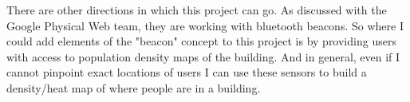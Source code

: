 \documentclass[11pt]{article}
\begin{document}
\quad There are other directions in which this project can go. As discussed with the Google Physical Web team, they are working with bluetooth beacons. So where I could add elements of the "beacon" concept to this project is by providing users with access to population density maps of the building. And in general, even if I cannot pinpoint exact locations of users I can use these sensors to build a density/heat map of where people are in a building.
\end{document}

